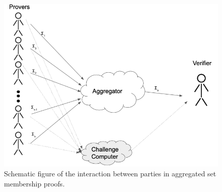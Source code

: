  \begin{figure}
\includegraphics[width=\linewidth]{./figure/genflow.png}
\caption{Schematic figure of the interaction between parties in aggregated set membership proofs. }
\label{fig:gen_workflow}
\end{figure} 




